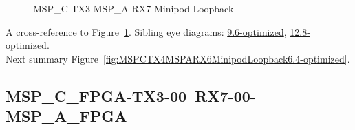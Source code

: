 \begin{figure}[h]
\begin{subfigure}{0.33\textwidth}
\hyperref[sec:MSPCFPGATX306RX706MSPAFPGA6.4-optimized]{}
\end{subfigure}\hspace*{\fill}
\begin{subfigure}{0.33\textwidth}
\hyperref[sec:MSPCFPGATX307RX707MSPAFPGA6.4-optimized]{}
\end{subfigure}\hspace*{\fill}
\begin{subfigure}{0.33\textwidth}
\hyperref[sec:MSPCFPGATX308RX708MSPAFPGA6.4-optimized]{}
\end{subfigure}

\begin{subfigure}{0.33\textwidth}
\hyperref[sec:MSPCFPGATX309RX709MSPAFPGA6.4-optimized]{}
\end{subfigure}\hspace*{\fill}
\begin{subfigure}{0.33\textwidth}
\hyperref[sec:MSPCFPGATX310RX710MSPAFPGA6.4-optimized]{}
\end{subfigure}\hspace*{\fill}
\begin{subfigure}{0.33\textwidth}
\hyperref[sec:MSPCFPGATX311RX711MSPAFPGA6.4-optimized]{}
\end{subfigure}

\caption{MSP\_C TX3 MSP\_A RX7 Minipod Loopback} \label{fig:MSPCTX3MSPARX7MinipodLoopback6.4-optimized}
\end{figure}

A cross-reference to Figure~\ref{fig:MSPCTX3MSPARX7MinipodLoopback6.4-optimized}.
Sibling eye diagrams: \hyperref[sec:MSPCTX3MSPARX7MinipodLoopback9.6-optimized]{9.6-optimized}, \hyperref[sec:MSPCTX3MSPARX7MinipodLoopback12.8-optimized]{12.8-optimized}. \\
Next summary Figure~\ref{fig:MSPCTX4MSPARX6MinipodLoopback6.4-optimized}.
\clearpage
% 
\subsection{MSP\_C\_FPGA-TX3-00--RX7-00-MSP\_A\_FPGA}\label{sec:MSPCFPGATX300RX700MSPAFPGA6.4-optimized}

